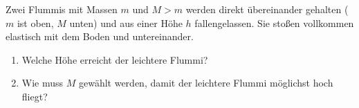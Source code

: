 \begin{Exercise}[label = Flummis, origin = Auswahlwettbewerb zur IPhO 2013, 4. Runde, difficulty = 3, title = Flummis]
Zwei Flummis mit Massen $m$ und $M>m$ werden direkt übereinander gehalten ($m$ ist oben, $M$ unten) und aus einer Höhe $h$
fallengelassen. Sie stoßen vollkommen elastisch mit dem Boden und untereinander.
\begin{enumerate}
\item Welche Höhe erreicht der leichtere Flummi?
\item Wie muss $M$ gewählt werden, damit der leichtere Flummi möglichst hoch fliegt?
\end{enumerate}  
\end{Exercise}
